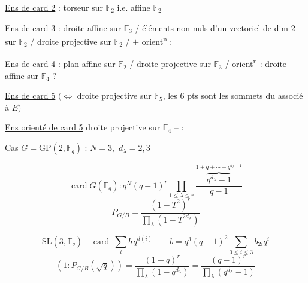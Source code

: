 \uline{Ens de card 2} : torseur sur \(\mathbb F_2\) i.e.   affine  \(\mathbb F_2\)

\uline{Ens de card 3} : droite affine sur \(\mathbb F_3\) / éléments non nuls d'un vectoriel de dim \(2\) sur \(\mathbb F_2\) / droite projective sur \(\mathbb F_2\) / \(+\) orient\textsuperscript{n} : 

\uline{Ens de card 4} :  plan affine sur \(\mathbb F_2\) / droite projective sur \(\mathbb F_3\) /  \uline{orient\textsuperscript{n}} : droite affine sur \(\mathbb F_4\) ?

\uline{Ens de card 5} \((\Leftrightarrow\) droite projective sur \(\mathbb F_5\), les \(6\) pts sont les sommets du  associé à \(E)\)

\uline{Ens orienté de card 5} droite projective sur \(\mathbb F_4\) --  :

Cas \(G=\mathrm{GP}(2,\mathbb F_q)\) :  \(N=3,\)  \(d_\lambda=2,3\)

\[\boxed{\operatorname{card}G(\mathbb F_q):q^N(q-1)^r\prod_{1\leq\lambda\leq r}\frac{\overbrace{q^{d_\lambda}-1}^{\displaystyle1+q+\cdots+q^{d_\lambda-1}}}{q-1}}\]
\[P_{G/B}=\frac{(1-T^2)^r}{\prod_\lambda(1-T^{2d_\lambda})}\]

\[\mathrm{SL}(3,\mathbb F_q)\quad\operatorname{card}\ \sum_i\underline b\,q^{d(i)}\qquad b=q^3(q-1)^2\sum_{0\leq i\leq3}b_{2i}q^i\]
\[(1:P_{G/B}(\sqrt q))=\frac{(1-q)^r}{\prod_\lambda(1-q^{d_\lambda})}=\frac{(q-1)^r}{\prod_\lambda(q^{d_\lambda}-1)}\]

